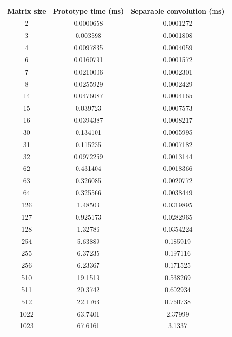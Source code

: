 \documentclass[12pt]{article}
\begin{document}
\begin{table}[hp]
    \centering
    {\footnotesize
    \begin{tabular}{| c | c | c |}
        \hline
        Matrix size & Prototype time (ms) & Separable convolution (ms) \\
        \hline
        2    & 0.0000658   &    0.0001272  \\
        3    & 0.003598    &    0.0001808  \\
        4    & 0.0097835   &    0.0004059  \\
        \hline
        6    & 0.0160791   &    0.0001572  \\
        7    & 0.0210006   &    0.0002301  \\
        8    & 0.0255929   &    0.0002429  \\
        \hline
        14   & 0.0476087   &    0.0004165  \\
        15   & 0.039723    &    0.0007573  \\
        16   & 0.0394387   &    0.0008217  \\
        \hline
        30   & 0.134101    &    0.0005995  \\
        31   & 0.115235    &    0.0007182  \\
        32   & 0.0972259   &    0.0013144  \\
        \hline
        62   & 0.431404    &    0.0018366  \\
        63   & 0.326085    &    0.0020772  \\
        64   & 0.325566    &    0.0038449  \\
        \hline
        126  & 1.48509     &    0.0319895  \\
        127  & 0.925173    &    0.0282965  \\
        128  & 1.32786     &    0.0354224  \\
        \hline
        254  & 5.63889     &    0.185919   \\
        255  & 6.37235     &    0.197116   \\
        256  & 6.23367     &    0.171525   \\
        \hline
        510  & 19.1519     &    0.538269   \\
        511  & 20.3742     &    0.602934   \\
        512  & 22.1763     &    0.760738   \\
        \hline
        1022 & 63.7401     &    2.37999    \\
        1023 & 67.6161     &    3.1337     \\

\end{tabular}}
\end{table}
\end{document}
